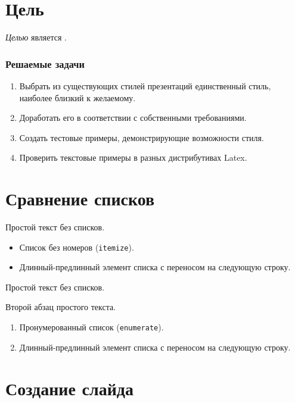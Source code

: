 \documentclass[12pt]{article}
\begin{document}

\TitleSlide


\section{Цель}

\emph{Целью} является .

\subsubsection{Решаемые задачи}

\begin{enumerate}
\item Выбрать из существующих стилей презентаций единственный стиль, наиболее близкий к желаемому.
\item Доработать его в соответствии с собственными требованиями.
\item Создать тестовые примеры, демонстрирующие возможности стиля.
\item Проверить текстовые примеры в разных дистрибутивах Latex.
\end{enumerate}

\section{Сравнение списков}

Простой текст без списков.

\begin{itemize}
\item Список без номеров (\verb+itemize+).
\item Длинный-предлинный элемент списка с переносом на следующую строку.
\end{itemize}

Простой текст без списков.

Второй абзац простого текста.

\begin{enumerate}
\item Пронумерованный список (\verb+enumerate+).
\item Длинный-предлинный элемент списка с переносом на следующую строку.
\end{enumerate}

\section{Создание слайда}
\end{document}
